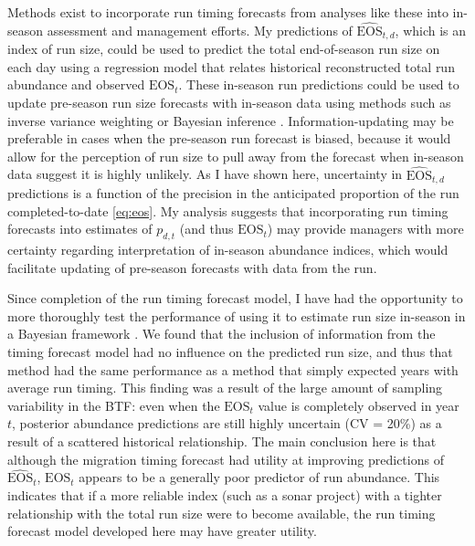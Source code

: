 \documentclass[12pt,]{book}
\theoremstyle{definition}
\theoremstyle{definition}
\theoremstyle{definition}
\theoremstyle{remark}
\begin{document}
Methods exist to incorporate run timing forecasts from analyses like
these into in-season assessment and management efforts. My predictions
of \(\widehat{\text{EOS}}_{t,d}\), which is an index of run size, could
be used to predict the total end-of-season run size on each day using a
regression model that relates historical reconstructed total run
abundance and observed \(\text{EOS}_t\). These in-season run predictions
could be used to update pre-season run size forecasts with in-season
data using methods such as inverse variance weighting
\citep[e.g.,][]{walters-buckingham-1975} or Bayesian inference
\citep[e.g.,][]{fried-hilborn-1988}. Information-updating may be
preferable in cases when the pre-season run forecast is biased, because
it would allow for the perception of run size to pull away from the
forecast when in-season data suggest it is highly unlikely. As I have
shown here, uncertainty in \(\widehat{\text{EOS}}_{t,d}\) predictions is
a function of the precision in the anticipated proportion of the run
completed-to-date \eqref{eq:eos}. My analysis suggests that incorporating
run timing forecasts into estimates of \(p_{d,t}\) (and thus
\(\text{EOS}_t\)) may provide managers with more certainty regarding
interpretation of in-season abundance indices, which would facilitate
updating of pre-season forecasts with data from the run.

Since completion of the run timing forecast model, I have had the
opportunity to more thoroughly test the performance of using it to
estimate run size in-season in a Bayesian framework
\citep{staton-catalano-2019}. We found that the inclusion of information
from the timing forecast model had no influence on the predicted run
size, and thus that method had the same performance as a method that
simply expected years with average run timing. This finding was a result
of the large amount of sampling variability in the BTF: even when the
\(\text{EOS}_{t}\) value is completely observed in year \(t\), posterior
abundance predictions are still highly uncertain (CV = 20\%) as a result
of a scattered historical relationship. The main conclusion here is that
although the migration timing forecast had utility at improving
predictions of \(\widehat{\text{EOS}}_t\), \(\text{EOS}_t\) appears to
be a generally poor predictor of run abundance. This indicates that if a
more reliable index (such as a sonar project) with a tighter
relationship with the total run size were to become available, the run
timing forecast model developed here may have greater utility.

\clearpage
\end{document}
